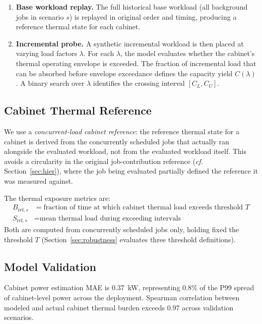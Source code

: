 \documentclass[acmsmall,screen,review,anonymous]{acmart}
\newcommand{\cf}{\textit{cf.}\xspace}
\begin{document}
\begin{enumerate}
  \item \textbf{Base workload replay.}  The full historical base workload (all background
    jobs in scenario $s$) is replayed in original order and timing, producing a reference
    thermal state for each cabinet.

  \item \textbf{Incremental probe.}  A synthetic incremental workload is then placed
    at varying load factors $\lambda$.  For each $\lambda$, the model evaluates whether
    the cabinet's thermal operating envelope is exceeded.  The fraction of incremental
    load that can be absorbed before envelope exceedance defines the capacity yield $C(\lambda)$.
    A binary search over $\lambda$ identifies the crossing interval $[C_L, C_U]$.
\end{enumerate}

\subsection{Cabinet Thermal Reference}

We use a \emph{concurrent-load cabinet reference}: the reference thermal state for a
cabinet is derived from the concurrently scheduled jobs that actually ran alongside
the evaluated workload, not from the evaluated workload itself.  This avoids a
circularity in the original job-contribution reference (\cf Section~\ref{sec:hier}),
where the job being evaluated partially defined the reference it was measured against.

The thermal exposure metrics are:
\begin{align}
  B_{\mathrm{ref},s} &= \text{fraction of time at which cabinet thermal load exceeds threshold } T \\
  S_{\mathrm{ref},s} &= \text{mean thermal load during exceeding intervals}
\end{align}
Both are computed from concurrently scheduled jobs only, holding fixed the threshold $T$
(Section~\ref{sec:robustness} evaluates three threshold definitions).

\subsection{Model Validation}

Cabinet power estimation MAE is \SI{0.37}{\kilo\watt}, representing 0.8\% of the P99
spread of cabinet-level power across the deployment.  Spearman correlation between
modeled and actual cabinet thermal burden exceeds 0.97 across validation scenarios.
\end{document}

